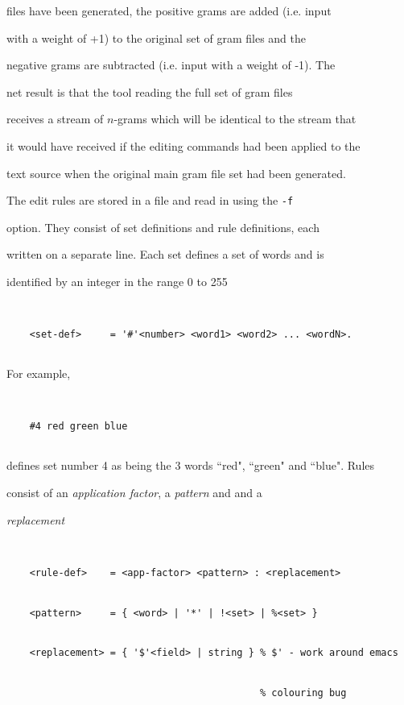 files have been generated, the positive grams are added (i.e. input


with a weight of +1) to the original set of gram files and the


negative grams are subtracted (i.e. input with a weight of -1).  The


net result is that the tool reading the full set of gram files


receives a stream of $n$-grams which will be identical to the stream that


it would have received if the editing commands had been applied to the


text source when the original main gram file set had been generated.





The edit rules are stored in a file and read in using the \texttt{-f}


option.  They consist of set definitions and rule definitions, each


written on a separate line. Each set defines a set of words and is


identified by an integer in the range 0 to 255


\begin{verbatim}


    <set-def>     = '#'<number> <word1> <word2> ... <wordN>.


\end{verbatim}


For example, 


\begin{verbatim}


    #4 red green blue 


\end{verbatim}


defines set number 4 as being the 3 words ``red", ``green" and ``blue".  Rules


consist of an \textit{application factor}, a \textit{pattern} and and a


\textit{replacement}


\begin{verbatim}


    <rule-def>    = <app-factor> <pattern> : <replacement>


    <pattern>     = { <word> | '*' | !<set> | %<set> }


    <replacement> = { '$'<field> | string } % $' - work around emacs


                                            % colouring bug


\end{verbatim}


